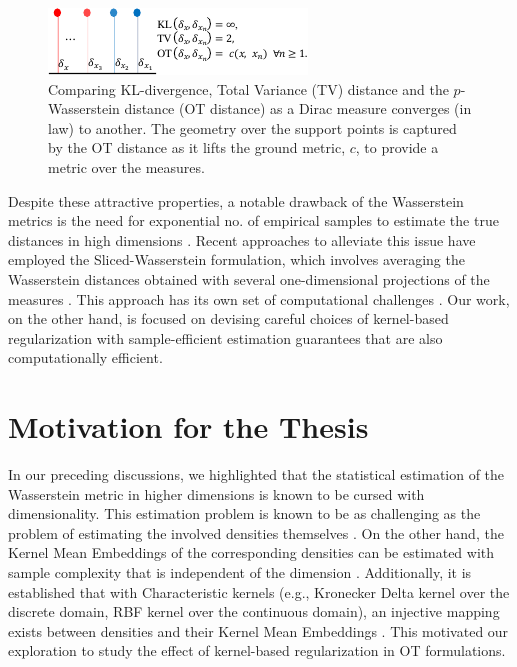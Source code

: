 \begin{figure}[t]
    \centering
    \includegraphics[width=0.5\linewidth]{intro-chapter/weak-conv2.pdf}
    \caption[Illustrating the geometry-induced OT distance and comparing with other divergences as a Dirac measure converges (in law) to another.]{Comparing KL-divergence, Total Variance (TV) distance and the $p$-Wasserstein distance (OT distance) as a Dirac measure converges (in law) to another. The geometry over the support points is captured by the OT distance as it lifts the ground metric, $c$, to provide a metric over the measures.}\label{fig:weak-conv}
\end{figure}
Despite these attractive properties, a notable drawback of the Wasserstein metrics is the need for exponential no. of empirical samples to estimate the true distances in high dimensions \citep{dudley1969,nilesweed2019estimation,Chewi2024StatisticalOT}. Recent approaches to alleviate this issue have employed the Sliced-Wasserstein formulation, which involves averaging the Wasserstein distances obtained with several one-dimensional projections of the measures \citep{bonet2023leveraging}. This approach has its own set of computational challenges \citep{peyre2019computational}. Our work, on the other hand, is focused on devising careful choices of kernel-based regularization with sample-efficient estimation guarantees that are also computationally efficient.

\section{Motivation for the Thesis}\label{motive}
In our preceding discussions, we highlighted that the statistical estimation of the Wasserstein metric in higher dimensions is known to be cursed with dimensionality. This estimation problem is known to be as challenging as the problem of estimating the involved densities themselves \citep{nilesweed2019estimation}. On the other hand, the Kernel Mean Embeddings of the corresponding densities can be estimated with sample complexity that is independent of the dimension \citep{Muandet_2017}. Additionally, it is established that with Characteristic kernels (e.g., Kronecker Delta kernel over the discrete domain, RBF kernel over the continuous domain), an injective mapping exists between densities and their Kernel Mean Embeddings \citep{Muandet_2017}. This motivated our exploration to study the effect of kernel-based regularization in OT formulations.

